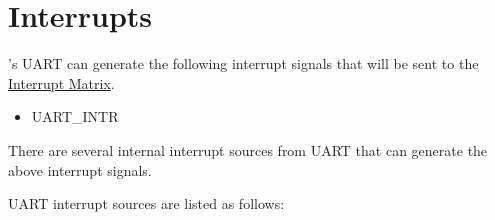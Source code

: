 \documentclass[main\_\_EN.tex]{subfiles}
\begin{document}
\section{Interrupts}

\chipname{}'s UART can generate the following interrupt signals that will be sent to the \hyperref[mod:intmtrx]{Interrupt Matrix}.

    \begin{itemize}
        \item { UART\_INTR}
    \end{itemize}

There are several internal interrupt sources from UART that can generate the above interrupt signals.

UART interrupt sources are listed as follows:
\end{document}
